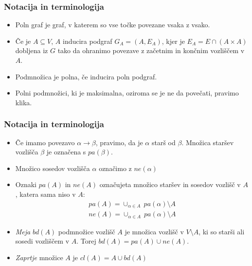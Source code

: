 \documentclass{beamer}
\begin{document}
\begin{frame}
    \frametitle{Notacija in terminologija}
    \begin{itemize}
        \item Poln graf je graf, v katerem so vse točke povezane vsaka z vsako.
        \item  Če je $A \subseteq V$, $A$ inducira podgraf $G_A = (A, E_A)$,
        kjer je $E_A = E \cap (A \times A)$ dobljena iz $G$ tako da ohranimo povezave z 
        začetnim in končnim vozliščem v $A$.
        \item Podmnožica je polna, če inducira poln podgraf.
        \item Polni podmnožici, ki je maksimalna, oziroma se je ne da povečati, pravimo klika.
   
    \end{itemize}

\end{frame}
\begin{frame}
    \frametitle{Notacija in terminologija}
    \begin{itemize}
        \item Če imamo povezavo $ \alpha \longrightarrow \beta $, pravimo, da je $\alpha$ starš od $\beta$.
        Množica staršev vozlišča $\beta$ je označena s $pa(\beta)$.  
        \item Množico sosedov vozlišča $\alpha$ označimo z $ne(\alpha)$
        \item Oznaki $pa(A)$ in $ne(A)$ označujeta množico staršev in sosedov vozlišč v $A$,
        katera sama niso v $A$:
        \begin{align*}
              pa(A) = \cup_{\alpha \in A} ~ pa(\alpha) \setminus A \\
              ne(A) = \cup_{\alpha \in A} ~ pa(\alpha) \setminus A
        \end{align*}
        \item \emph{Meja} $bd(A)$ podmnožice vozlišč $A$ je množica vozlišč v $ V \setminus A $,
        ki so starši ali sosedi vozliščem v $A$. Torej $ bd(A) = pa(A) \cup ne(A)$. 
        \item \emph{Zaprtje} množice $A$ je $cl(A) = A \cup bd(A) $
    \end{itemize}

\end{frame}
\end{document}

